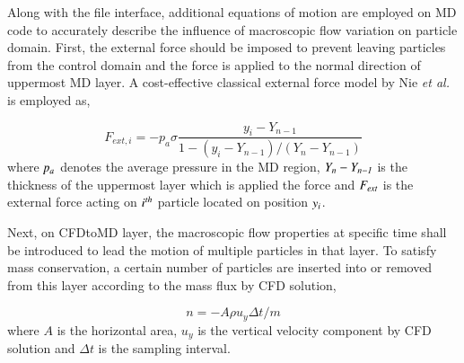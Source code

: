\documentclass[preprint,12pt]{elsarticle}
\newcommand{\skonote}[1]{ {\textcolor{green} { ***Jeff: #1 }}}
\newcommand{\skonote}[1]{}
\begin{document}
Along with the file interface, additional equations of motion are employed on MD code to accurately describe the influence of macroscopic flow variation on particle domain. First, the external force should be imposed to prevent leaving particles from the control domain and the force is applied to the normal direction of uppermost MD layer. A cost-effective classical external force model by Nie {\it{et al.}}~\cite{Nie} is employed as,


\vspace{-.2em}
\begin{equation}
 F_{ext, i} = -p_{a}\sigma\frac{y_{i}-Y_{n-1}}{1-(y_{i}-Y_{n-1})/(Y_{n}-Y_{n-1})}
 \label{eq:External_Force}
\end{equation}
\normalsize
where $\it p_{a}$ denotes the average pressure in the MD region, $\it Y_{n}-Y_{n-1}$ is the thickness of the uppermost layer which is applied the force and $\it F_{ext}$ is the external force acting on $\it i^{th}$ particle located on position $\it y_{i}$.


Next, on CFDtoMD layer, the macroscopic flow properties at specific time shall be introduced to lead the motion of multiple particles in that layer. To satisfy mass conservation, a certain number of particles are inserted into or removed from this layer according to the mass flux by CFD solution,

\vspace{-.2em}
\begin{equation}
n = -A \rho u_y \Delta t / m
 \label{eq:Mass_Flux}
\end{equation}
\normalsize
where $A$ is the horizontal area, $u_y$ is the vertical velocity component by CFD solution and $\Delta t$ is the sampling interval.
\end{document}
